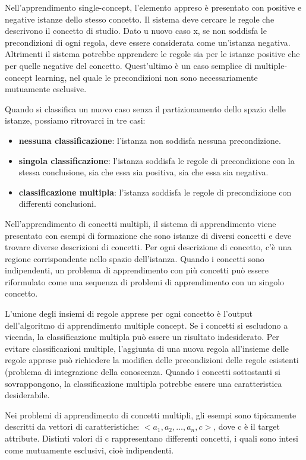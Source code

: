 \documentclass[a4paper]{extarticle}
\begin{document}
Nell'apprendimento single-concept, l'elemento appreso è presentato con positive e negative istanze dello stesso concetto. Il sistema deve cercare le regole che descrivono il concetto di studio. Dato u nuovo caso x, se non soddisfa le precondizioni di ogni regola, deve essere considerata come un'istanza negativa. Altrimenti il sistema potrebbe apprendere le regole sia per le istanze positive che per quelle negative del concetto. Quest'ultimo è un caso semplice di multiple-concept learning, nel quale le precondizioni non sono necessariamente mutuamente esclusive.

Quando si classifica un nuovo caso senza il partizionamento dello spazio delle istanze, possiamo ritrovarci in tre casi:

\begin{itemize}
	\item \textbf{nessuna classificazione}: l'istanza non soddisfa nessuna precondizione.
	\item \textbf{singola classificazione}: l'istanza soddisfa le regole di precondizione con la stessa conclusione, sia che essa sia positiva, sia che essa sia negativa.
	\item \textbf{classificazione multipla}: l'istanza soddisfa le regole di precondizione con differenti conclusioni.
\end{itemize}

Nell'apprendimento di concetti multipli, il sistema di apprendimento viene presentato con esempi di formazione che sono istanze di diversi concetti e deve trovare diverse descrizioni di concetti. Per ogni descrizione di concetto, c'è una regione corrispondente nello spazio dell'istanza. Quando i concetti sono indipendenti, un problema di apprendimento con più concetti può essere riformulato come una sequenza di problemi di apprendimento con un singolo concetto.

L'unione degli insiemi di regole apprese per ogni concetto è l'output dell'algoritmo di apprendimento multiple concept. Se i concetti si escludono a vicenda, la classificazione multipla può essere un risultato indesiderato. Per evitare classificazioni multiple, l'aggiunta di una nuova regola all'insieme delle regole apprese può richiedere la modifica delle precondizioni delle regole esistenti (problema di integrazione della conoscenza. Quando i concetti sottostanti si sovrappongono, la classificazione multipla potrebbe essere una caratteristica desiderabile.

Nei problemi di apprendimento di concetti multipli, gli esempi sono tipicamente descritti da vettori di caratteristiche: $<a_1,a_2,\dots,a_n,c>$, dove c è il target attribute. Distinti valori di c rappresentano differenti concetti, i quali sono intesi come mutuamente esclusivi, cioè indipendenti.
\end{document}
